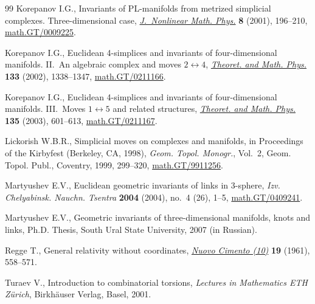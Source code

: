 \documentclass[11pt]{article}
\begin{document}
\begin{thebibliography}{99}
Korepanov I.G.,
Invariants of PL-manifolds from metrized simplicial complexes. Three-dimensional case,
\href{http://dx.doi.org/10.2991/jnmp.2001.8.2.3}{{\it J.~Nonlinear Math. Phys.}} {\bf 8} (2001), 196--210,
\href{http://arxiv.org/abs/math.GT/0009225}{math.GT/0009225}.

Korepanov I.G.,
Euclidean 4-simplices and invariants of four-dimensional manifolds. II.~An algebraic complex and moves $2\leftrightarrow 4$,
\href{http://dx.doi.org/10.1023/A:1020689829261}{{\it Theoret. and Math. Phys.}} {\bf 133} (2002), 1338--1347,
\href{http://arxiv.org/abs/math.GT/0211166}{math.GT/0211166}.

Korepanov I.G.,
Euclidean 4-simplices and invariants of four-dimensional manifolds. III.~Moves $1\leftrightarrow 5$ and related structures,
\href{http://dx.doi.org/10.1023/A:1023625313495}{{\it Theoret. and Math. Phys.}} {\bf 135} (2003), 601--613,
\href{http://arxiv.org/abs/math.GT/0211167}{math.GT/0211167}.

Lickorish W.B.R.,
Simplicial moves on complexes and manifolds,
in Proceedings of the Kirbyfest (Berkeley, CA, 1998),
{\it Geom. Topol. Monogr.}, Vol.~2, Geom. Topol. Publ., Coventry, 1999, 299--320,
\href{http://arxiv.org/abs/math.GT/9911256}{math.GT/9911256}.

Martyushev E.V.,
Euclidean geometric invariants of links in 3-sphere,
{\it Izv. Chelyabinsk. Nauchn. Tsentra} \textbf{2004} (2004), no.~4 (26), 1--5,
\href{http://arxiv.org/abs/math.GT/0409241}{math.GT/0409241}.

Martyushev E.V.,
Geometric invariants of three-dimensional manifolds, knots and links, Ph.D. Thesis, South Ural State University, 2007 (in Russian).

Regge T.,
General relativity without coordinates,
\href{http://dx.doi.org/10.1007/BF02733251}{{\it Nuovo Cimento (10)}} {\bf 19} (1961), 558--571.

Turaev V.,
Introduction to combinatorial torsions, {\it Lectures in Mathematics ETH Z\"urich}, Birkh\"auser Verlag, Basel, 2001.

\end{thebibliography}
\end{document}
